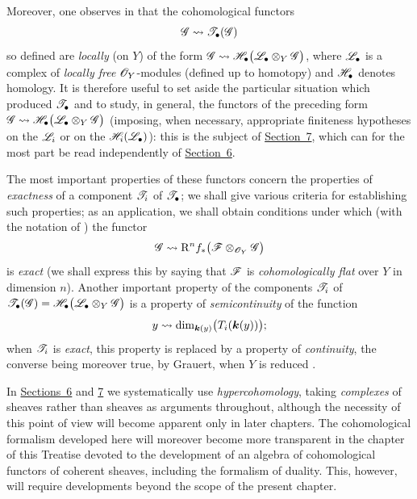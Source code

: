 \begin{env}[6.1.2]
\label{III.6.1.2}
Moreover, one observes in  that the cohomological
functors
\[
  \mathscr{G}\leadsto\mathscr{T}_\bullet(\mathscr{G})
\]
so defined are \emph{locally} (on $Y$) of the form $\mathscr{G}\leadsto
\mathscr{H}_\bullet\bigl(\mathscr{L}_\bullet\otimes_Y\mathscr{G}\bigr)$,
where $\mathscr{L}_\bullet$ is a complex of \emph{locally free}
$\mathscr{O}_Y$-modules (defined up to homotopy) and
$\mathscr{H}_\bullet$ denotes homology.  It is therefore useful to set
aside the particular situation which produced
$\mathscr{T}_\bullet$ and to study, in
general, the functors of the preceding form
$\mathscr{G}\leadsto\mathscr{H}_\bullet\bigl(\mathscr{L}_\bullet\otimes_Y\mathscr{G}\bigr)$
(imposing, when necessary, appropriate
finiteness hypotheses on the $\mathscr{L}_i$ or on the
$\mathscr{H}_i(\mathscr{L}_\bullet)$): this is the subject of \hyperref[section:III.7]{Section~7},
which can for the most part be read independently of \hyperref[section:III.6]{Section~6}.

The most important properties of these functors concern the
properties of \emph{exactness} of a component $\mathscr{T}_i$ of $\mathscr{T}_\bullet$; we shall give
various criteria for establishing such properties; as an
application, we shall obtain conditions under which (with the
notation of ) the functor
\[
  \mathscr{G}\leadsto
  \mathrm{R}^n f_*\bigl(\mathscr{F}\otimes_{\mathscr{O}_Y}\mathscr{G}\bigr)
\]
is \emph{exact} (we shall express this by saying that $\mathscr{F}$ is
\emph{cohomologically flat} over $Y$ in dimension $n$).
Another important property of the components $\mathscr{T}_i$ of $\mathscr{T}_\bullet(\mathscr{G})
=
\mathscr{H}_\bullet\bigl(\mathscr{L}_\bullet\otimes_Y\mathscr{G}\bigr)$
is a property of \emph{semicontinuity} of the function
\[
  y\leadsto
  \dim_{\boldsymbol{k}(y)}\bigl(T_i(\boldsymbol{k}(y))\bigr);
\]
when $\mathscr{T}_i$ is \emph{exact}, this property is replaced by a property of
\emph{continuity}, the converse being moreover true, by Grauert, when $Y$ is reduced
.
\end{env}

\begin{env}[6.1.3]
\label{III.6.1.3}
In \hyperref[section:III.6]{Sections~6} and \hyperref[section:III.7]{7} we systematically use \emph{hypercohomology}, taking
\emph{complexes} of sheaves rather than sheaves as arguments throughout,
although the necessity of this point of view will become apparent
only in later chapters.  The cohomological formalism developed here
will moreover become more transparent in the chapter of this
Treatise devoted to the development of an algebra of cohomological functors of coherent
sheaves, including the formalism of duality.  This, however, will
require developments beyond the scope of the present chapter.
\end{env}

